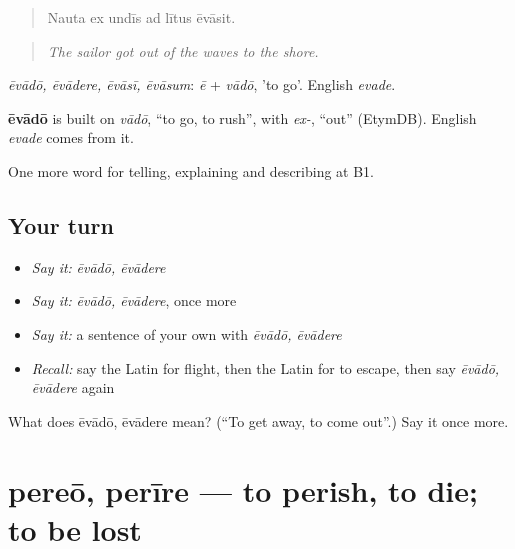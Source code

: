 \begin{quote}
Nauta ex undīs ad lītus ēvāsit.
\end{quote}

\begin{quote}
\emph{The sailor got out of the waves to the shore.}
\end{quote}

\emph{ēvādō, ēvādere, ēvāsī, ēvāsum}: \emph{ē} + \emph{vādō}, 'to go'. English \emph{evade}.

\begin{cousinweb}
\textbf{ēvādō} is built on \emph{vādō}, \textquotedblleft{}to go, to rush\textquotedblright{}, with \emph{ex-}, \textquotedblleft{}out\textquotedblright{} (EtymDB). English \emph{evade} comes from it.
\end{cousinweb}

\begin{grammarlens}[title={What you've built}]
One more word for telling, explaining and describing at B1.
\end{grammarlens}

\subsection*{Your turn}
\begin{itemize}
\raggedright
  \item \emph{Say it:} \emph{ēvādō, ēvādere}
  \item \emph{Say it:} \emph{ēvādō, ēvādere}, once more
  \item \emph{Say it:} a sentence of your own with \emph{ēvādō, ēvādere}
  \item \emph{Recall:} say the Latin for flight, then the Latin for to escape, then say \emph{ēvādō, ēvādere} again
\end{itemize}

\begin{tcolorbox}[breakable,colback=teal!4,colframe=teal!35!black,title={Before you move on}]
What does ēvādō, ēvādere mean? (\textquotedblleft{}To get away, to come out\textquotedblright{}.) Say it once more.
\end{tcolorbox}
\section[pereō, perīre]{pereō, perīre — to perish, to die; to be lost}

\label{lesson:LA-C322-pereo}



